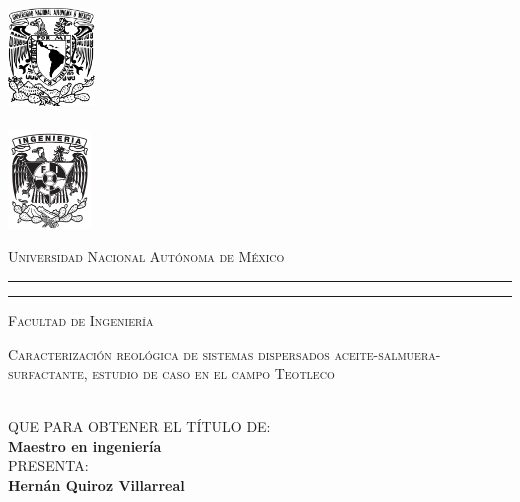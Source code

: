 
\begin{titlepage}
\thispagestyle{empty}

\hskip -2cm
\begin{minipage}[c][10cm][s]{3cm}
  \begin{center}
    \includegraphics[height=2.6cm]{Graphics/unam}\\[10pt]
    \hskip2pt\vrule width2.5pt height13cm\hskip1mm
    \vrule width1pt height13cm\\[10pt]
    \includegraphics[height=2.6cm]{Graphics/fi}
  \end{center}
\end{minipage}\quad
\begin{minipage}[c][9.5cm][s]{11cm}
  \begin{center}
    {\Large \scshape Universidad Nacional Autónoma de México}
    \vspace{.3cm}
    \hrule height2.5pt
    \vspace{.1cm}
    \hrule height1pt
    \vspace{.3cm}
    {\scshape  Facultad de Ingeniería}

    \vspace{.3cm}


    \vspace{3cm}

    {\Large \scshape {Caracterización reológica de sistemas dispersados aceite-salmuera-surfactante, estudio de caso en el campo Teotleco }}

    \vspace{3cm}

    \\[8pt]
    QUE PARA OBTENER EL TÍTULO DE:\\[5pt]
    \textbf{Maestro en ingeniería}\\[40pt]
    PRESENTA:\\[5pt]
    \textbf{Hernán Quiroz Villarreal}


\end{center}
\end{minipage}
\end{titlepage}
